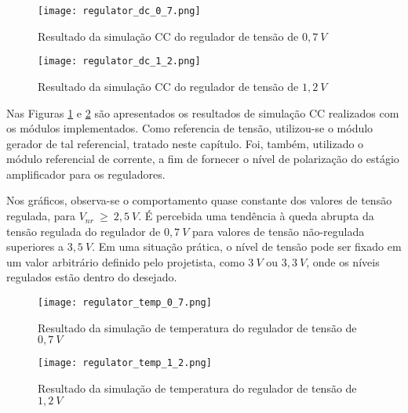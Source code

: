 \begin{figure}[!hb]
	\caption{\label{fig:regulator_dc_0_7}Resultado da simulação {CC} do regulador de tensão de $0,7~V$}
	\begin{center}
		\texttt{[image: regulator\_dc\_0\_7.png]}
	\end{center}
\end{figure}

\begin{figure}[!hb]
	\caption{\label{fig:regulator_dc_1_2}Resultado da simulação {CC} do regulador de tensão de $1,2~V$}
	\begin{center}
		\texttt{[image: regulator\_dc\_1\_2.png]}
	\end{center}
\end{figure}

Nas Figuras \ref{fig:regulator_dc_0_7} e \ref{fig:regulator_dc_1_2} são apresentados os resultados de simulação {CC} realizados com os módulos implementados. Como referencia de tensão, utilizou-se o módulo gerador de tal referencial, tratado neste capítulo. Foi, também, utilizado o módulo referencial de corrente, a fim de fornecer o nível de polarização do estágio amplificador para os reguladores.

Nos gráficos, observa-se o comportamento quase constante dos valores de tensão regulada, para $V_{nr}~\geq~2,5~V$. É percebida uma tendência à queda abrupta da tensão regulada do regulador de $0,7~V$ para valores de tensão não-regulada superiores a $3,5~V$. Em uma situação prática, o nível de tensão pode ser fixado em um valor arbitrário definido pelo projetista, como $3~V$ ou $3,3~V$, onde os níveis regulados estão dentro do desejado.

\begin{figure}[!htb]
	\caption{\label{fig:regulator_temp_0_7}Resultado da simulação de temperatura do regulador de tensão de $0,7~V$}
	\begin{center}
		\texttt{[image: regulator\_temp\_0\_7.png]}
	\end{center}
\end{figure}

\begin{figure}[!htb]
	\caption{\label{fig:regulator_temp_1_2}Resultado da simulação de temperatura do regulador de tensão de $1,2~V$}
	\begin{center}
		\texttt{[image: regulator\_temp\_1\_2.png]}
	\end{center}
\end{figure}

